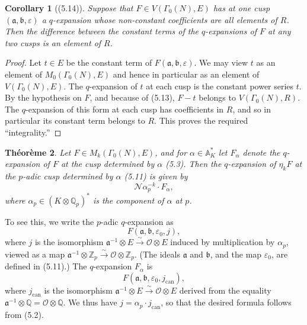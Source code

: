 \documentclass[12pt,a4paper]{article}
\theoremstyle{plain}
\newtheorem{theorem}{Th\'{e}or\`{e}me}[section]
\newtheorem{corollary}[theorem]{Corollary}
\theoremstyle{definition}
\theoremstyle{remark}
\newenvironment{namedtheorem}[1][]{%
  \renewcommand{\thetheorem}{#1}%
  \theoremstyle{plain}%
  \begin{theorem}%
}{\end{theorem}\renewcommand{\thetheorem}{\arabic{section}.\arabic{theorem}}}
\begin{document}
\begin{corollary}[(5.14)]
Suppose that $F \in V(\Gamma_0(N), E)$ has at one cusp $(\mathfrak{a}, \mathfrak{b}, \varepsilon)$ a $q$-expansion whose non-constant coefficients are all elements of $R$. Then the difference between the constant terms of the $q$-expansions of $F$ at any two cusps is an element of $R$.
\end{corollary}

\begin{proof}
Let $t \in E$ be the constant term of $F(\mathfrak{a}, \mathfrak{b}, \varepsilon)$. We may view $t$ as an element of $M_0(\Gamma_0(N), E)$ and hence in particular as an element of $V(\Gamma_0(N), E)$. The $q$-expansion of $t$ at each cusp is the constant power series $t$. By the hypothesis on $F$, and because of (5.13), $F - t$ belongs to $V(\Gamma_0(N), R)$. The $q$-expansion of this form at each cusp has coefficients in $R$, and so in particular its constant term belongs to $R$. This proves the required ``integrality.''
\end{proof}

\begin{namedtheorem}[(5.15)]
Let $F \in M_k(\Gamma_0(N), E)$, and for $\alpha \in \mathbb{A}_K^*$ let $F_\alpha$ denote the $q$-expansion of $F$ at the cusp determined by $\alpha$ (5.3). Then the $q$-expansion of $\eta_k F$ at the $p$-adic cusp determined by $\alpha$ (5.11) is given by
\[
\mathcal{N}\alpha_p^{-k} \cdot F_\alpha,
\]
where $\alpha_p \in (K \otimes \mathbb{Q}_p)^*$ is the component of $\alpha$ at $p$.
\end{namedtheorem}

To see this, we write the $p$-adic $q$-expansion as
\[
F(\mathfrak{a}, \mathfrak{b}, \varepsilon_0, j),
\]
where $j$ is the isomorphism $\mathfrak{a}^{-1} \otimes E \xrightarrow{\sim} \mathcal{O} \otimes E$ induced by multiplication by $\alpha_p$, viewed as a map $\mathfrak{a}^{-1} \otimes \mathbb{Z}_p \xrightarrow{\sim} \mathcal{O} \otimes \mathbb{Z}_p$. (The ideals $\mathfrak{a}$ and $\mathfrak{b}$, and the map $\varepsilon_0$, are defined in (5.11).) The $q$-expansion $F_\alpha$ is
\[
F(\mathfrak{a}, \mathfrak{b}, \varepsilon_0, j_{\mathrm{can}}),
\]
where $j_{\mathrm{can}}$ is the isomorphism $\mathfrak{a}^{-1} \otimes E \xrightarrow{\sim} \mathcal{O} \otimes E$ derived from the equality $\mathfrak{a}^{-1} \otimes \mathbb{Q} = \mathcal{O} \otimes \mathbb{Q}$. We thus have $j = \alpha_p \cdot j_{\mathrm{can}}$, so that the desired formula follows from (5.2).
\end{document}
